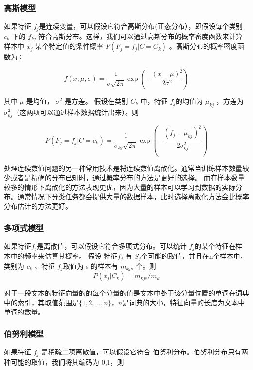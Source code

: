 \documentclass[UTF8,zihao=-4]{ctexart}
\begin{document}
\subsubsection{高斯模型}
	如果特征 $f_j $是连续变量，可以假设它符合高斯分布(正态分布），即假设每个类别 $c_k$ 下的 $f_{kj}$ 符合高斯分布。这样，我们可以通过高斯分布的概率密度函数来计算样本中 $x_j$ 某个特定值的条件概率 $P(F_j=f_j|C=C_k)$ 。高斯分布的概率密度函数为： 
	
	\begin{equation}
	f(x ; \mu, \sigma)=\frac{1}{\sigma \sqrt{2 \pi}} \exp \left(-\frac{(x-\mu)^{2}}{2 \sigma^{2}}\right)
	\end{equation}
	
	其中 $\mu$ 是均值， $\sigma^2$ 是方差。 假设在类别 $C_k$ 中，特征 $f_j$的均值为 $\mu_{kj}$ ，方差为 $\sigma_{kj}^2$（这两项可以通过样本数据统计出来）。则 
	
	\begin{equation}
	P\left(F_j=f_{j} | C=c_{k}\right)=\frac{1}{\sigma_{k j} \sqrt{2 \pi}} \exp \left(-\frac{\left(f_{j}-\mu_{k j}\right)^{2}}{2 \sigma_{k j}^{2}}\right)
	\end{equation}
	
	处理连续数值问题的另一种常用技术是将连续数值离散化。通常当训练样本数量较少或者是精确的分布已知时，通过概率分布的方法是更好的选择。 而在样本数量较多的情形下离散化的方法表现更优，因为大量的样本可以学习到数据的实际分布。通常情况下分类任务都会提供大量的数据样本，此时选择离散化方法会比概率分布估计的方法更好。
\subsubsection{多项式模型}
	如果特征$f_j$是离散值，可以假设它符合多项式分布。可以统计 $f_j $的某个特征在样本中的频率来估算其概率。 假设 特征$ f_j$ 有 $S_j $个可能的取值，并且在n个样本中，类别为 $c_k$ 、特征 $f_j $取值为 s 的样本有 $m_{kjs}$ 个。则
	\begin{equation}
		P\left(x_{j} | C_{k}\right)=m_{k j s} / m_{k}
	\end{equation}
	
	对于一段文本的特征向量的的每个分量的值是文本中处于该分量位置的单词在词典中的索引，其取值范围是$\{1,2,\dots,n\}$，$n$是词典的大小，特征向量的长度为文本中单词的数量。
	
\subsubsection{伯努利模型}
如果特征 $f_j$ 是稀疏二项离散值，可以假设它符合 伯努利分布。伯努利分布只有两种可能的取值，我们将其编码为 {0,1}，则
\end{document}
